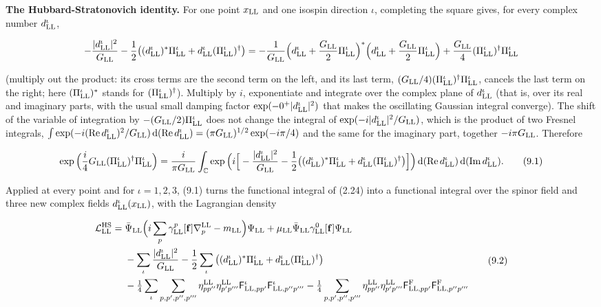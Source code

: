 \documentclass[
  10pt,
]{article}
\begin{document}
\textbf{The Hubbard-Stratonovich identity.} For one point \(x_{\rm LL}\)
and one isospin direction \(\iota\), completing the square gives, for
every complex number \(d^\iota_{\rm LL}\),

\[-\frac{\lvert d^\iota_{\rm LL}\rvert^2}{G_{\rm LL}}-\frac12\big((d^\iota_{\rm LL})^*\Pi^\iota_{\rm LL}+d^\iota_{\rm LL}(\Pi^\iota_{\rm LL})^\dagger\big)=-\frac1{G_{\rm LL}}\Big(d^\iota_{\rm LL}+\frac{G_{\rm LL}}2\Pi^\iota_{\rm LL}\Big)^*\Big(d^\iota_{\rm LL}+\frac{G_{\rm LL}}2\Pi^\iota_{\rm LL}\Big)+\frac{G_{\rm LL}}4(\Pi^\iota_{\rm LL})^\dagger\Pi^\iota_{\rm LL}\]

(multiply out the product: its cross terms are the second term on the
left, and its last term,
\((G_{\rm LL}/4)(\Pi^\iota_{\rm LL})^\dagger\Pi^\iota_{\rm LL}\),
cancels the last term on the right; here \((\Pi^\iota_{\rm LL})^*\)
stands for \((\Pi^\iota_{\rm LL})^\dagger\)). Multiply by \(i\),
exponentiate and integrate over the complex plane of
\(d^\iota_{\rm LL}\) (that is, over its real and imaginary parts, with
the usual small damping factor
\(\exp(-0^+\lvert d^\iota_{\rm LL}\rvert^2)\) that makes the oscillating
Gaussian integral converge). The shift of the variable of integration by
\(-(G_{\rm LL}/2)\Pi^\iota_{\rm LL}\) does not change the integral of
\(\exp(-i\lvert d^\iota_{\rm LL}\rvert^2/G_{\rm LL})\), which is the
product of two Fresnel integrals,
\(\int\exp(-i({\rm Re}\,d^\iota_{\rm LL})^2/G_{\rm LL})\,{\rm d}({\rm Re}\,d^\iota_{\rm LL})=(\pi G_{\rm LL})^{1/2}\exp(-i\pi/4)\)
and the same for the imaginary part, together \(-i\pi G_{\rm LL}\).
Therefore

\[\exp\Big(\frac i4G_{\rm LL}(\Pi^\iota_{\rm LL})^\dagger\Pi^\iota_{\rm LL}\Big)=\frac{i}{\pi G_{\rm LL}}\int_{\mathbb C}\exp\Big(i\Big[-\frac{\lvert d^\iota_{\rm LL}\rvert^2}{G_{\rm LL}}-\frac12\big((d^\iota_{\rm LL})^*\Pi^\iota_{\rm LL}+d^\iota_{\rm LL}(\Pi^\iota_{\rm LL})^\dagger\big)\Big]\Big)\,{\rm d}({\rm Re}\,d^\iota_{\rm LL})\,{\rm d}({\rm Im}\,d^\iota_{\rm LL}).\tag{9.1}\]

Applied at every point and for \(\iota=1,2,3\), (9.1) turns the
functional integral of (2.24) into a functional integral over the spinor
field and three new complex fields \(d^\iota_{\rm LL}(x_{\rm LL})\),
with the Lagrangian density

\[\begin{aligned}\mathcal L^{\rm HS}_{\rm LL}={}&\bar\Psi_{\rm LL}\Big(i\sum_p\gamma^p_{\rm LL}[\mathbf f]\nabla^{\rm LL}_p-m_{\rm LL}\Big)\Psi_{\rm LL}+\mu_{\rm LL}\bar\Psi_{\rm LL}\gamma^0_{\rm LL}[\mathbf f]\Psi_{\rm LL}\\&-\sum_\iota\frac{\lvert d^\iota_{\rm LL}\rvert^2}{G_{\rm LL}}-\frac12\sum_\iota\big((d^\iota_{\rm LL})^*\Pi^\iota_{\rm LL}+d^\iota_{\rm LL}(\Pi^\iota_{\rm LL})^\dagger\big)\\&-\tfrac14\sum_\iota\sum_{p,p',p'',p'''}\eta^{\rm LL}_{pp''}\eta^{\rm LL}_{p'p'''}\mathsf F^\iota_{{\rm LL},pp'}\mathsf F^\iota_{{\rm LL},p''p'''}-\tfrac14\sum_{p,p',p'',p'''}\eta^{\rm LL}_{pp''}\eta^{\rm LL}_{p'p'''}\mathsf F^{\rm F}_{{\rm LL},pp'}\mathsf F^{\rm F}_{{\rm LL},p''p'''}\end{aligned}\tag{9.2}\]
\end{document}
